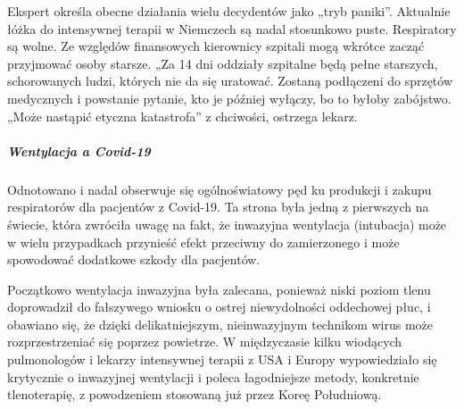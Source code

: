 Ekspert określa obecne działania wielu decydentów jako „tryb paniki''.
Aktualnie łóżka do intensywnej terapii w Niemczech są nadal stosunkowo
puste. Respiratory są wolne. Ze względów finansowych kierownicy szpitali
mogą wkrótce zacząć przyjmować osoby starsze. „Za 14 dni oddziały
szpitalne będą pełne starszych, schorowanych ludzi, których nie da się
uratować. Zostaną podłączeni do sprzętów medycznych i powstanie pytanie,
kto je później wyłączy, bo to byłoby zabójstwo. „Może nastąpić etyczna
katastrofa'' z chciwości, ostrzega lekarz.

\hypertarget{wentylacja-a-covid-19-1}{%
\subparagraph{\texorpdfstring{\textbf{Wentylacja a
Covid-19}}{Wentylacja a Covid-19}}\label{wentylacja-a-covid-19-1}}

Odnotowano i nadal obserwuje się ogólnoświatowy pęd ku produkcji i
zakupu respiratorów dla pacjentów z Covid-19. Ta strona była jedną z
pierwszych na świecie, która zwróciła uwagę na fakt, że inwazyjna
wentylacja (intubacja) może w wielu przypadkach przynieść efekt
przeciwny do zamierzonego i może spowodować dodatkowe szkody dla
pacjentów.

Początkowo wentylacja inwazyjna była zalecana, ponieważ niski poziom
tlenu doprowadził do fałszywego wniosku o ostrej niewydolności
oddechowej płuc, i obawiano się, że dzięki delikatniejszym,
nieinwazyjnym technikom wirus może rozprzestrzeniać się poprzez
powietrze. W międzyczasie kilku wiodących pulmonologów i lekarzy
intensywnej terapii z USA i Europy wypowiedziało się krytycznie o
inwazyjnej wentylacji i poleca łagodniejsze metody, konkretnie
tlenoterapię, z powodzeniem stosowaną już przez Koreę Południową.

